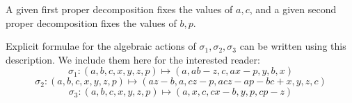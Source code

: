 \documentclass[letterpaper]{amsart}
\begin{document}
A given first proper decomposition fixes the values of $a,c$, and a given second proper decomposition fixes the values of $b,p$.
    
Explicit formulae for the algebraic actions of $\sigma_1,\sigma_2,\sigma_3$ can be written using this description. We  include them here for the interested reader:
    $$\sigma_1: (a,b,c,x,y,z,p)\mapsto(a,ab-z,c,ax-p,y,b,x)$$
    $$\sigma_2: (a,b,c,x,y,z,p)\mapsto(az-b,a,cz-p,acz-ap-bc+x,y,z,c)$$    $$\sigma_3: (a,b,c,x,y,z,p)\mapsto(a,x,c,cx-b,y,p,cp-z)$$



\vspace{0.5cm}


\end{document}
